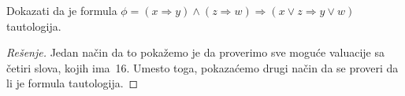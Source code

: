 \begin{EX}
  Dokazati da je formula $\phi = (x \Rightarrow y) \land (z \Rightarrow w) \Rightarrow (x \lor z \Rightarrow y \lor w)$
  tautologija.
\end{EX}
\begin{proof}[Re\v senje]
%  
  Jedan na\v cin da to poka\v zemo je da proverimo sve mogu\'ce valuacije sa \v cetiri slova, kojih ima~16.
  Umesto toga, pokaza\'cemo drugi na\v cin da se proveri da li je formula tautologija.


\end{proof}
